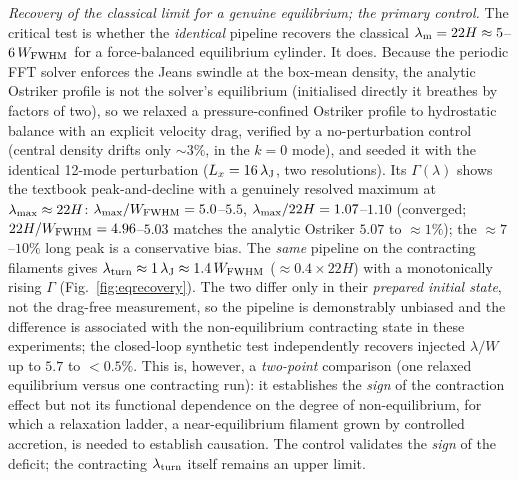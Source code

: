\documentclass[usenatbib,twoside,twocolumn]{mnras}
\begin{document}
\emph{Recovery of the classical limit for a genuine equilibrium; the primary control.} The critical test is whether the \emph{identical} pipeline recovers the classical $\lambda_{\rm m}=22H\approx5$--$6\,W_{\rm FWHM}$ for a force-balanced equilibrium cylinder. It does. Because the periodic FFT solver enforces the Jeans swindle at the box-mean density, the analytic Ostriker profile is not the solver's equilibrium (initialised directly it breathes by factors of two), so we relaxed a pressure-confined Ostriker profile to hydrostatic balance with an explicit velocity drag, verified by a no-perturbation control (central density drifts only $\sim3\%$, in the $k=0$ mode), and seeded it with the identical 12-mode perturbation ($L_x=16\,\lambda_{\rm J}$, two resolutions). Its $\Gamma(\lambda)$ shows the textbook peak-and-decline with a genuinely resolved maximum at $\lambda_{\rm max}\approx22H$: $\lambda_{\rm max}/W_{\rm FWHM}=5.0$--$5.5$, $\lambda_{\rm max}/22H=1.07$--$1.10$ (converged; $22H/W_{\rm FWHM}=4.96$--$5.03$ matches the analytic Ostriker $5.07$ to $\approx1\%$); the $\approx7$--$10\%$ long peak is a conservative bias. The \emph{same} pipeline on the contracting filaments gives $\lambda_{\rm turn}\approx1\,\lambda_{\rm J}\approx1.4\,W_{\rm FWHM}$ ($\approx0.4\times22H$) with a monotonically rising $\Gamma$ (Fig.~\ref{fig:eqrecovery}). The two differ only in their \emph{prepared initial state}, not the drag-free measurement, so the pipeline is demonstrably unbiased and the difference is associated with the non-equilibrium contracting state in these experiments; the closed-loop synthetic test independently recovers injected $\lambda/W$ up to $5.7$ to $<0.5\%$. This is, however, a \emph{two-point} comparison (one relaxed equilibrium versus one contracting run): it establishes the \emph{sign} of the contraction effect but not its functional dependence on the degree of non-equilibrium, for which a relaxation ladder, a near-equilibrium filament grown by controlled accretion, is needed to establish causation. The control validates the \emph{sign} of the deficit; the contracting $\lambda_{\rm turn}$ itself remains an upper limit.
\end{document}
